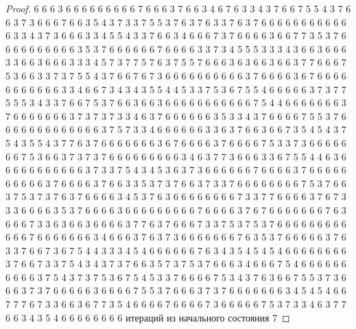 \begin{proof}
	6 6 6 3 6 6 6 6 6 6 6 6 6 7 6 6 6 3 7 6 6 3 4 6 7 6 3 3 4 3 7 6 6 7 5 5 4 3 7 6 6 3 7 3 6 6 6 7 6 6 3 5 4 3 7 3 3 7 5 5 3 7 6 3 7 6 3 3 7 6 3 7 6 6 6 6 6 6 6 6 6 6 6 6 3 3 4 3 7 3 6 6 6 3 3 4 5 5 4 3 3 7 6 6 3 4 6 6 6 7 3 7 6 6 6 6 3 6 6 7 7 3 5 3 7 6 6 6 6 6 6 6 6 6 6 3 5 3 7 6 6 6 6 6 6 7 6 6 6 6 3 3 7 3 4 5 5 5 3 3 3 4 3 6 6 3 6 6 6 3 3 6 6 3 6 6 6 3 3 3 4 5 7 3 7 7 5 7 6 3 7 5 5 7 6 6 6 3 6 3 6 6 3 6 6 3 7 7 6 6 6 7 5 3 6 6 3 3 7 3 7 5 5 4 3 7 6 6 7 6 7 3 6 6 6 6 6 6 6 6 6 6 3 7 6 6 6 6 3 6 7 6 6 6 6 6 6 6 6 6 6 6 3 3 4 6 6 7 3 4 3 4 3 5 5 4 4 5 3 3 7 5 3 6 7 5 5 4 6 6 6 6 6 3 7 3 7 7 5 5 5 3 4 3 3 7 6 6 7 5 3 7 6 6 3 6 6 3 6 6 6 6 6 6 6 6 6 6 6 7 5 4 4 6 6 6 6 6 6 6 3 7 6 6 6 6 6 6 6 3 7 3 7 3 7 3 3 4 6 3 7 6 6 6 6 6 6 3 5 3 3 4 3 7 6 6 6 6 7 5 5 3 7 6 6 6 6 6 6 6 6 6 6 6 6 6 3 7 5 7 3 3 4 6 6 6 6 6 6 3 3 6 3 7 6 6 3 6 6 7 3 5 4 5 4 3 7 5 4 3 5 5 4 3 7 7 6 3 7 6 6 6 6 6 6 6 3 6 7 6 6 6 6 3 7 6 6 6 6 7 5 3 3 7 3 6 6 6 6 6 6 6 7 5 3 6 6 3 7 3 7 3 7 6 6 6 6 6 6 6 6 6 3 4 6 3 7 7 3 6 6 6 3 3 6 7 5 5 4 4 6 3 6 6 6 6 6 6 6 6 6 6 6 3 7 3 3 7 5 4 3 4 5 3 6 3 7 3 6 6 6 6 6 6 7 6 6 6 6 3 7 6 6 6 6 6 6 6 6 6 6 3 7 6 6 6 6 3 7 6 6 3 3 5 3 7 3 7 6 6 3 7 3 3 7 6 6 6 6 6 6 6 6 7 5 3 7 6 6 3 7 5 3 7 3 7 6 3 7 6 6 6 6 3 4 5 3 7 6 3 6 6 6 6 6 6 6 6 7 3 3 7 7 6 6 6 6 3 7 6 7 3 3 3 6 6 6 6 3 5 3 7 6 6 6 6 3 6 6 6 6 6 6 6 6 6 7 6 6 6 6 3 7 6 7 6 6 6 6 6 6 6 7 6 3 6 6 6 7 3 3 6 3 6 6 3 6 6 6 6 3 7 7 6 3 7 6 6 6 7 3 3 7 5 3 7 5 3 7 6 6 6 6 6 6 6 6 6 6 6 6 7 6 6 6 6 6 6 6 3 4 6 6 6 3 7 6 3 7 3 6 6 6 6 6 6 6 7 6 3 5 3 7 6 6 6 6 6 3 7 6 3 3 7 6 6 7 3 6 7 5 4 4 3 3 3 4 5 4 6 6 6 6 6 6 7 6 3 4 3 5 4 5 4 5 4 6 6 6 6 6 6 6 6 3 7 6 6 7 3 3 7 5 4 3 4 3 7 3 7 6 6 3 5 7 3 7 5 3 7 6 6 6 3 4 6 6 6 7 5 4 6 6 6 6 6 6 6 6 6 6 3 7 5 4 3 7 3 7 5 3 6 7 5 4 5 3 3 7 6 6 6 6 7 5 3 4 3 7 6 3 6 6 7 5 5 3 7 3 6 6 6 3 7 3 7 6 6 6 6 6 3 6 6 6 6 7 5 5 3 7 6 6 6 3 7 3 7 6 6 6 6 6 6 6 3 4 5 4 5 4 6 6 7 7 7 6 7 3 3 6 6 3 6 7 7 3 5 4 6 6 6 6 7 6 6 6 6 7 3 6 6 6 6 6 7 5 3 7 3 3 4 6 3 7 7 6 6 3 4 3 5 4 6 6 6 6 6 6 6 6 
	\newline
	 итераций из начального состояния 7
	\newline

\end{proof}

